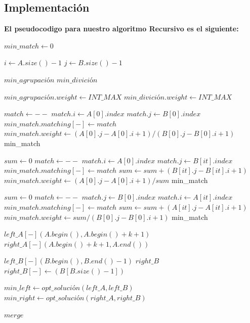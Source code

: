 \documentclass{article}
\begin{document}
\subsection{Implementación}
\textbf{El pseudocodigo para nuestro algoritmo Recursivo es el siguiente:}
\begin{algorithmic}

\STATE $min\_match\gets 0$

\STATE $i\gets A.size()-1$
\STATE $j\gets B.size()-1$

\STATE $min\_agrupaci{ó}n$
\STATE $min\_divici{ó}n$

\STATE $min\_agrupaci{ó}n.weight\gets INT\_MAX$
\STATE $min\_divici{ó}n.weight\gets INT\_MAX$

        \STATE $match\gets - -$
        \STATE $match.i\gets A[0].index$
        \STATE $match.j\gets B[0].index$
        \STATE $min\_match.matching[-]\gets match$
        \STATE $min\_match.weight\gets (A[0].j - A[0].i + 1) / (B[0].j - B[0].i + 1)$
        \RETURN min\_match
\ENDIF 

        \STATE $sum\gets 0$
        \STATE $match\gets - -$
        \STATE $match.i\gets A[0].index$
        \STATE $match.j\gets B[it].index$
        \STATE $min\_match.matching[-]\gets match$
        \STATE $sum\gets sum + (B[it].j - B[it].i + 1)$
        \ENDFOR
        \STATE $min\_match.weight\gets (A[0].j - A[0].i + 1) / sum$
        \RETURN min\_match
\ENDIF 

        \STATE $sum\gets 0$
        \STATE $match\gets - -$
        \STATE $match.j\gets B[0].index$
        \STATE $match.i\gets A[it].index$
        \STATE $min\_match.matching[-]\gets match$
        \STATE $sum\gets sum + (A[it].j - A[it].i + 1)$
        \ENDFOR
        \STATE $min\_match.weight\gets sum / (B[0].j - B[0].i + 1)$
        \RETURN min\_match
\ENDIF

    \STATE $left\_A[-](A.begin(),A.begin()+k+1)$
    \STATE $right\_A[-](A.begin()+k+1,A.end())$
    
    \STATE $left\_B[-](B.begin(),B.end()-1)$
    \STATE $right\_B$
    \STATE $right\_B[-]\gets (B[B.size()-1])$
    
    \STATE $min\_left\gets opt\_soluci{ó}n(left\_A, left\_B)$
    \STATE $min\_right\gets opt\_soluci{ó}n(right\_A, right\_B)$
    
    \STATE $merge$
    

\end{algorithmic}
\end{document}
